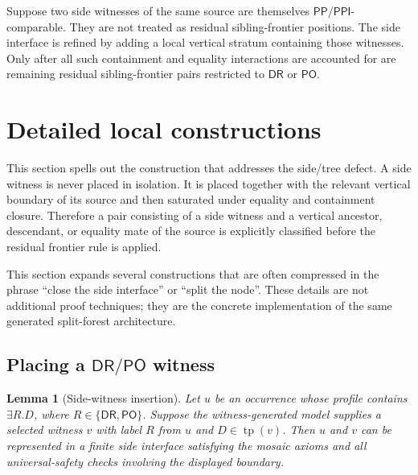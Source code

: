 \documentclass[11pt]{article}
\newtheorem{lemma}[theorem]{Lemma}
\newcommand{\DR}{\mathsf{DR}}
\newcommand{\PO}{\mathsf{PO}}
\newcommand{\PP}{\mathsf{PP}}
\newcommand{\PPI}{\mathsf{PPI}}
\newcommand{\typ}{\operatorname{tp}}
\begin{document}
Suppose two side witnesses of the same source are themselves $\PP/\PPI$-comparable.  They are not treated as residual sibling-frontier positions.  The side interface is refined by adding a local vertical stratum containing those witnesses.  Only after all such containment and equality interactions are accounted for are remaining residual sibling-frontier pairs restricted to $\DR$ or $\PO$.



\section{Detailed local constructions}

This section spells out the construction that addresses the side/tree defect.  A side witness is never placed in isolation.  It is placed together with the relevant vertical boundary of its source and then saturated under equality and containment closure.  Therefore a pair consisting of a side witness and a vertical ancestor, descendant, or equality mate of the source is explicitly classified before the residual frontier rule is applied.

\label{sec:detailed-local}

This section expands several constructions that are often compressed in the phrase ``close the side interface'' or ``split the node''.  These details are not additional proof techniques; they are the concrete implementation of the same generated split-forest architecture.

\subsection{Placing a \texorpdfstring{$\DR/\PO$}{DR/PO} witness}

\begin{lemma}[Side-witness insertion]\label{lem:side-witness-insertion}
Let $u$ be an occurrence whose profile contains $\exists R.D$, where $R\in\{\DR,\PO\}$.  Suppose the witness-generated model supplies a selected witness $v$ with label $R$ from $u$ and $D\in\typ(v)$.  Then $u$ and $v$ can be represented in a finite side interface satisfying the mosaic axioms and all universal-safety checks involving the displayed boundary.
\end{lemma}
\end{document}
